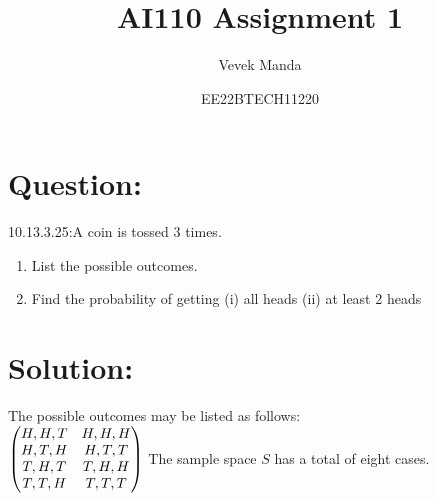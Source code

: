 \documentclass{article}
\title{AI110 Assignment 1}
\author{Vevek Manda }
\date{EE22BTECH11220}
\begin{document}
	
	
	
	\maketitle
	
	\section*{Question:}
	
	10.13.3.25:A coin is tossed 3 times. 
 \begin{enumerate}
     \item  List the possible outcomes.
	\item Find the probability of getting
	(i) all heads (ii) at least 2 heads

 \end{enumerate}
	
	\section*{Solution:}
	The possible outcomes may be listed as follows:\\
	$\begin{pmatrix}
		{H,H,T} & {H,H,H}\\
		{H,T,H} & {H,T,T}\\
		{T,H,T} & {T,H,H}\\
		{T,T,H} & {T,T,T}
	\end{pmatrix}\\[3pt]$
	The sample space $S$ has a total of eight cases.
	
\end{document}
